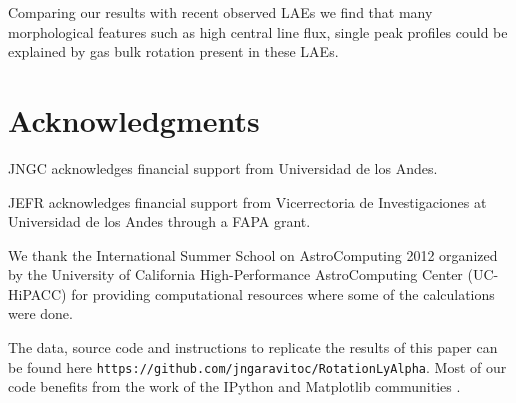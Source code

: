 \documentclass{emulateapj}
\begin{document}
Comparing our results with recent observed LAEs we find that many 
morphological features such as high central line flux, single peak
profiles  could be explained by gas bulk  rotation present in these
LAEs.  

\section*{Acknowledgments}

JNGC acknowledges financial support from Universidad de los
Andes. 

JEFR acknowledges financial support from Vicerrectoria de
Investigaciones at Universidad de los Andes through a FAPA grant.

We thank the International Summer School on AstroComputing
2012 organized by the University of California High-Performance
AstroComputing Center (UC-HiPACC) for providing computational
resources where some of the calculations were done. 

The data, source code and instructions to
replicate the results of this paper can be found
here {\texttt{https://github.com/jngaravitoc/RotationLyAlpha}}.
Most of our code benefits from the work of the IPython and Matplotlib
communities \citep{IPython,matplotlib}.





 
\end{document}
